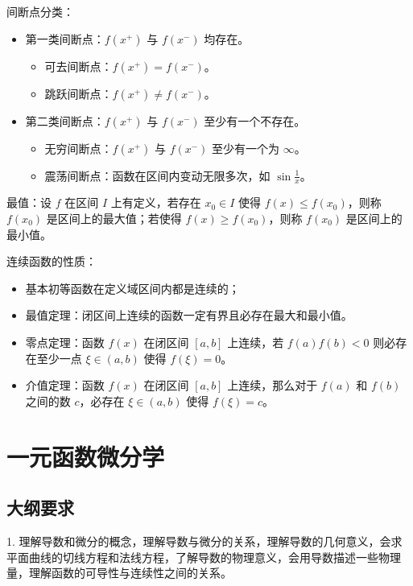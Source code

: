 间断点分类：

\begin{itemize}
	\item 第一类间断点：$f(x^+)$ 与 $f(x^-)$ 均存在。
	      \begin{itemize}
		      \item 可去间断点：$f(x^+) = f(x^-)$。
		      \item 跳跃间断点：$f(x^+) \neq f(x^-)$。
	      \end{itemize}
	\item 第二类间断点：$f(x^+)$ 与 $f(x^-)$ 至少有一个不存在。
	      \begin{itemize}
		      \item 无穷间断点：$f(x^+)$ 与 $f(x^-)$ 至少有一个为 $\infty$。
		      \item 震荡间断点：函数在区间内变动无限多次，如 $\sin \frac{1}{x}$。
	      \end{itemize}
\end{itemize}


最值：设 $f$ 在区间 $I$ 上有定义，若存在 $x_0 \in I$ 使得 $f(x) \leqslant f(x_0)$，则称 $f(x_0)$ 是区间上的最大值；若使得 $f(x) \geqslant f(x_0)$，则称 $f(x_0)$ 是区间上的最小值。

连续函数的性质：

\begin{itemize}
	\item 基本初等函数在定义域区间内都是连续的；
	\item 最值定理：闭区间上连续的函数一定有界且必存在最大和最小值。
	\item 零点定理：函数 $f(x)$ 在闭区间 $[a, b]$ 上连续，若 $f(a)f(b) < 0$ 则必存在至少一点 $\xi \in (a, b)$ 使得 $f(\xi) = 0$。
	\item 介值定理：函数 $f(x)$ 在闭区间 $[a, b]$ 上连续，那么对于 $f(a)$ 和 $f(b)$ 之间的数 $c$，必存在 $\xi \in (a, b)$ 使得 $f(\xi) = c$。
\end{itemize}

\section{一元函数微分学}

\subsection{大纲要求}

1. 理解导数和微分的概念，理解导数与微分的关系，理解导数的几何意义，会求平面曲线的切线方程和法线方程，了解导数的物理意义，会用导数描述一些物理量，理解函数的可导性与连续性之间的关系。

